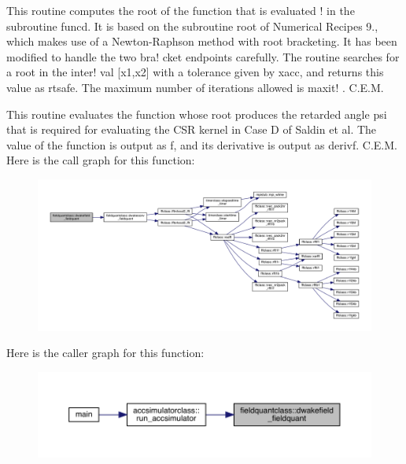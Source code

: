 This routine computes the root of the function that is evaluated ! in the subroutine \textquotesingle{}funcd\textquotesingle{}. It is based on the subroutine \textquotesingle{}root\textquotesingle{} of Numerical Recipes 9., which makes use of a Newton-\/\+Raphson method with root bracketing. It has been modified to handle the two bra! cket endpoints carefully. The routine searches for a root in the inter! val \mbox{[}x1,x2\mbox{]} with a tolerance given by \textquotesingle{}xacc\textquotesingle{}, and returns this value as \textquotesingle{}rtsafe\textquotesingle{}. The maximum number of iterations allowed is \textquotesingle{}maxit\textquotesingle{}! . C.\+E.\+M. 

This routine evaluates the function whose root produces the retarded angle psi that is required for evaluating the C\+SR kernel in Case D of Saldin et al. The value of the function is output as \textquotesingle{}f\textquotesingle{}, and its derivative is output as \textquotesingle{}derivf\textquotesingle{}. C.\+E.\+M. Here is the call graph for this function\+:\nopagebreak
\begin{figure}[H]
\begin{center}
\leavevmode
\includegraphics[width=350pt]{namespacefieldquantclass_a990a046cc996cb957a94c4995bfe803a_cgraph}
\end{center}
\end{figure}
Here is the caller graph for this function\+:\nopagebreak
\begin{figure}[H]
\begin{center}
\leavevmode
\includegraphics[width=350pt]{namespacefieldquantclass_a990a046cc996cb957a94c4995bfe803a_icgraph}
\end{center}
\end{figure}
\mbox{\label{namespacefieldquantclass_a3979aaa9ea17b446b00cd5477dfd354e}} 
